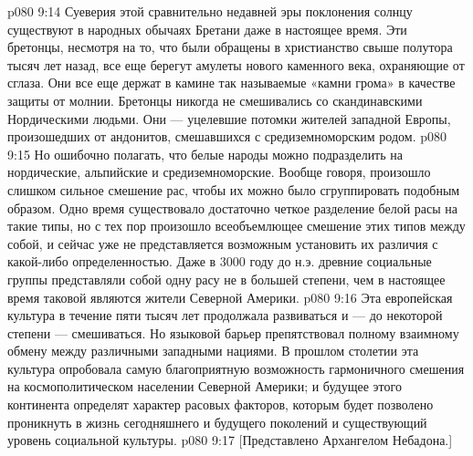 \vs p080 9:14 Суеверия этой сравнительно недавней эры поклонения солнцу существуют в народных обычаях Бретани даже в настоящее время. Эти бретонцы, несмотря на то, что были обращены в христианство свыше полутора тысяч лет назад, все еще берегут амулеты нового каменного века, охраняющие от сглаза. Они все еще держат в камине так называемые «камни грома» в качестве защиты от молнии. Бретонцы никогда не смешивались со скандинавскими Нордическими людьми. Они --- уцелевшие потомки жителей западной Европы, произошедших от андонитов, смешавшихся с средиземноморским родом.
\vs p080 9:15 \pc Но ошибочно полагать, что белые народы можно подразделить на нордические, альпийские и средиземноморские. Вообще говоря, произошло слишком сильное смешение рас, чтобы их можно было сгруппировать подобным образом. Одно время существовало достаточно четкое разделение белой расы на такие типы, но с тех пор произошло всеобъемлющее смешение этих типов между собой, и сейчас уже не представляется возможным установить их различия с какой\hyp{}либо определенностью. Даже в 3000 году до н.э. древние социальные группы представляли собой одну расу не в большей степени, чем в настоящее время таковой являются жители Северной Америки.
\vs p080 9:16 Эта европейская культура в течение пяти тысяч лет продолжала развиваться и --- до некоторой степени --- смешиваться. Но языковой барьер препятствовал полному взаимному обмену между различными западными нациями. В прошлом столетии эта культура опробовала самую благоприятную возможность гармоничного смешения на космополитическом населении Северной Америки; и будущее этого континента определят характер расовых факторов, которым будет позволено проникнуть в жизнь сегодняшнего и будущего поколений и существующий уровень социальной культуры.
\vsetoff
\vs p080 9:17 [Представлено Архангелом Небадона.]
